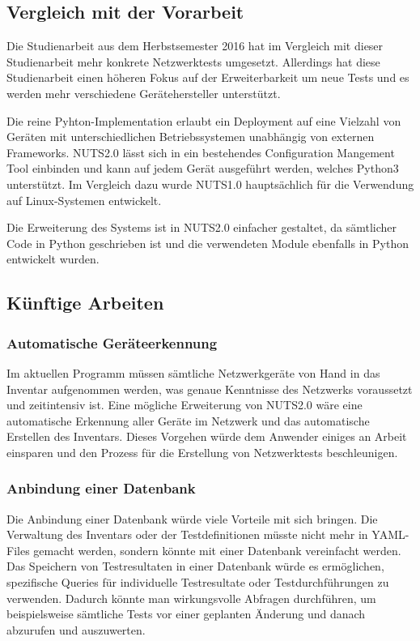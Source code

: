 \documentclass[]{subfiles}
\begin{document}
\newpage

\subsection{Vergleich mit der Vorarbeit}
Die Studienarbeit aus dem Herbstsemester 2016 hat im Vergleich mit dieser Studienarbeit
mehr konkrete Netzwerktests umgesetzt. 
Allerdings hat diese Studienarbeit einen höheren Fokus auf der Erweiterbarkeit um neue
Tests und es werden mehr verschiedene Gerätehersteller unterstützt.

Die reine Pyhton-Implementation erlaubt ein Deployment auf eine Vielzahl von Geräten 
mit unterschiedlichen Betriebssystemen unabhängig von externen Frameworks.
NUTS2.0 lässt sich in ein bestehendes Configuration Mangement Tool einbinden und kann
auf jedem Gerät ausgeführt werden, welches Python3 unterstützt.
Im Vergleich dazu wurde NUTS1.0 hauptsächlich für die Verwendung auf Linux-Systemen entwickelt.

Die Erweiterung des Systems ist in NUTS2.0 einfacher gestaltet, da sämtlicher Code in 
Python geschrieben ist und die verwendeten Module ebenfalls in Python entwickelt wurden.

\newpage




\subsection{Künftige Arbeiten}
\label{subsec:Künftige Arbeiten}
\subsubsection*{Automatische Geräteerkennung}
Im aktuellen Programm müssen sämtliche Netzwerkgeräte von Hand in das Inventar aufgenommen
werden, was genaue Kenntnisse des Netzwerks voraussetzt und zeitintensiv ist.
Eine mögliche Erweiterung von NUTS2.0 wäre eine automatische Erkennung aller Geräte im 
Netzwerk und das automatische Erstellen des Inventars.
Dieses Vorgehen würde dem Anwender einiges an Arbeit einsparen und den Prozess für die 
Erstellung von Netzwerktests beschleunigen.

\subsubsection*{Anbindung einer Datenbank}
Die Anbindung einer Datenbank würde viele Vorteile mit sich bringen.
Die Verwaltung des Inventars oder der Testdefinitionen müsste nicht mehr in YAML-Files 
gemacht werden, sondern könnte mit einer Datenbank vereinfacht werden.
Das Speichern von Testresultaten in einer Datenbank würde es ermöglichen, 
spezifische Queries für individuelle Testresultate oder Testdurchführungen zu verwenden.
Dadurch könnte man wirkungsvolle Abfragen durchführen, um beispielsweise sämtliche 
Tests vor einer geplanten Änderung und danach abzurufen und auszuwerten.
\end{document}
